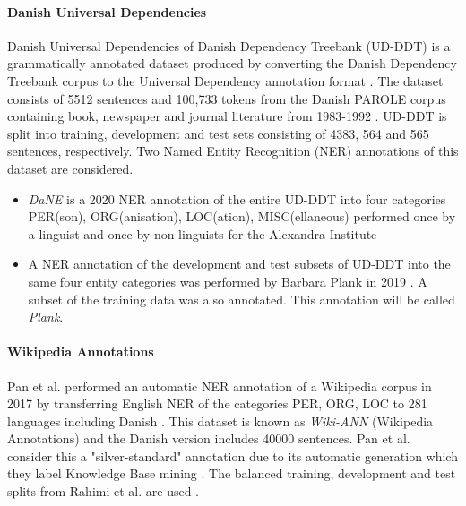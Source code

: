\documentclass[main.tex]{subfiles}
\begin{document}
\paragraph{Danish Universal Dependencies}
Danish Universal Dependencies of Danish Dependency Treebank (UD-DDT) is a grammatically annotated dataset produced by converting the Danish Dependency Treebank corpus \cite{kromann2003ddt} to the Universal Dependency annotation format \cite{johann2015udddt}.
The dataset consists of 5512 sentences and 100,733 tokens from the Danish PAROLE corpus containing book, newspaper and journal literature from 1983-1992 \cite{christensen1998parole}.
UD-DDT is split into training, development and test sets consisting of 4383, 564 and 565 sentences, respectively.
Two Named Entity Recognition (NER) annotations of this dataset are considered.
\begin{itemize}
    \item \emph{DaNE} is a 2020 NER annotation of the entire UD-DDT into four categories PER(son), ORG(anisation), LOC(ation), MISC(ellaneous) performed once by a linguist and once by non-linguists for the Alexandra Institute \cite[Sec. 4]{hvingelby2020dane}
    \item A NER annotation of the development and test subsets of UD-DDT into the same four entity categories was performed by Barbara Plank in 2019 \cite{plank2019neural}.
    A subset of the training data was also annotated.
    This annotation will be called \emph{Plank}.
\end{itemize}

\paragraph{Wikipedia Annotations}
Pan et al. performed an automatic NER annotation of a Wikipedia corpus in 2017 by transferring English NER of the categories PER, ORG, LOC to 281 languages including Danish \cite{pan2017wikiann}.
This dataset is known as \emph{Wiki-ANN} (Wikipedia Annotations) and the Danish version includes 40000 sentences.
Pan et al. consider this a "silver-standard" annotation due to its automatic generation which they label Knowledge Base mining \cite[1946]{pan2017wikiann}.
The balanced training, development and test splits from Rahimi et al. are used \cite{rahimi2019transfer}.
\end{document}
